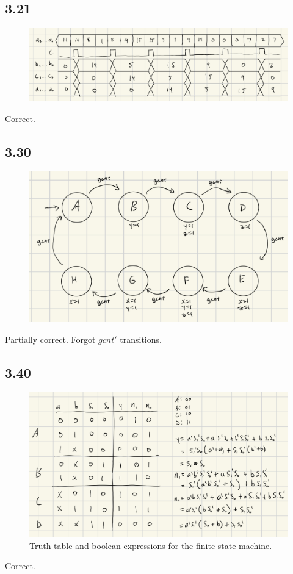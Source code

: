 \documentclass{article}
\begin{document}
\subsection*{3.21}
\begin{figure}[H]
    \centering
    \includegraphics[width=\textwidth]{./images/3_21.jpg}
\end{figure}
\textcolor{mygreen}{Correct.}

\subsection*{3.30}
\begin{figure}[H]
    \centering
    \includegraphics[width=\textwidth]{./images/3_30.jpg}
\end{figure}
\textcolor{myorange}{Partially correct. Forgot $gcnt'$ transitions.}

\subsection*{3.40}
\begin{figure}[H]
    \centering
    \includegraphics[width=\textwidth]{./images/3_40.jpg}
    \caption*{Truth table and boolean expressions for the finite state machine.}
\end{figure}
\textcolor{mygreen}{Correct.}
\end{document}
